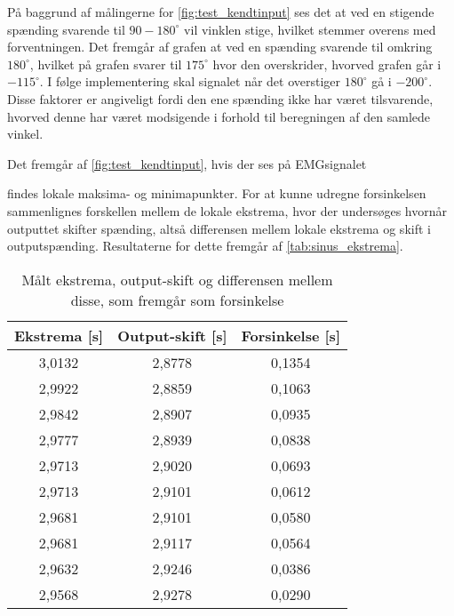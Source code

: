 På baggrund af målingerne for \autoref{fig:test_kendtinput} ses det at ved en stigende spænding svarende til $90-180^{\circ}$ vil vinklen stige, hvilket stemmer overens med forventningen. Det fremgår af grafen at ved en spænding svarende til omkring $180^{\circ}$, hvilket på grafen svarer til $175^{\circ}$ hvor den overskrider, hvorved grafen går i $-115^{\circ}$. I følge implementering skal signalet når det overstiger $180^{\circ}$ gå i $-200^{\circ}$. Disse faktorer er angiveligt fordi den ene spænding ikke har været tilsvarende, hvorved denne har været modsigende i forhold til beregningen af den samlede vinkel.

Det fremgår af \autoref{fig:test_kendtinput}, hvis der ses på EMGsignalet 


 findes lokale maksima- og minimapunkter. For at kunne udregne forsinkelsen sammenlignes forskellen mellem de lokale ekstrema, hvor der undersøges hvornår outputtet skifter spænding, altså differensen mellem lokale ekstrema og skift i outputspænding. Resultaterne for dette fremgår af \autoref{tab:sinus_ekstrema}.


\begin{table}[H]
\centering
\begin{tabular}{|c|c|c|}
\hline
\textbf{Ekstrema {[}s{]}} & \textbf{Output-skift {[}s{]}} & \textbf{Forsinkelse {[}s{]}} \\ \hline
3,0132                    & 2,8778                        & 0,1354                       \\ \hline
2,9922                    & 2,8859                        & 0,1063                       \\ \hline
2,9842                    & 2,8907                        & 0,0935                       \\ \hline
2,9777                    & 2,8939                        & 0,0838                       \\ \hline
2,9713                    & 2,9020                        & 0,0693                       \\ \hline
2,9713                    & 2,9101                        & 0,0612                       \\ \hline
2,9681                    & 2,9101                        & 0,0580                       \\ \hline
2,9681                    & 2,9117                        & 0,0564                       \\ \hline
2,9632                    & 2,9246                        & 0,0386                       \\ \hline
2,9568                    & 2,9278                        & 0,0290                       \\ \hline
\end{tabular}
\caption{Målt ekstrema, output-skift og differensen mellem disse, som fremgår som forsinkelse}
\label{tab:sinus_ekstrema}
\end{table}

